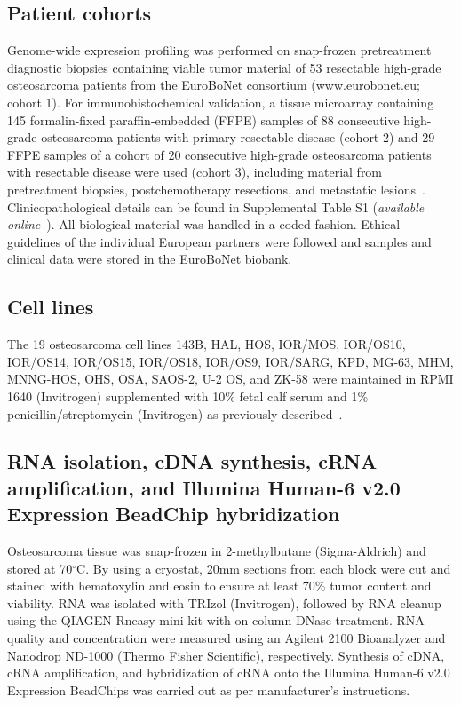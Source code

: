 \subsection{Patient cohorts}
Genome\hyp{}wide expression profiling was performed on
snap\hyp{}frozen pretreatment diagnostic biopsies containing
viable tumor material of 53 resectable high\hyp{}grade osteosarcoma
patients from the EuroBoNet consortium (\url{www.eurobonet.eu}; cohort 1). For immunohistochemical
validation, a tissue microarray containing 145 formalin\hyp{}fixed
paraffin\hyp{}embedded (FFPE) samples of 88 consecutive
high\hyp{}grade osteosarcoma patients with primary resectable
disease (cohort 2) and 29 FFPE samples of a cohort of 20
consecutive high\hyp{}grade osteosarcoma patients with resectable
disease were used (cohort 3), including material from
pretreatment biopsies, postchemotherapy resections, and
metastatic lesions~\cite{mohseny2009osteosarcoma}. Clinicopathological details can be
found in Supplemental Table S1 ({\it available online}~\cite{ch4additional}). All biological material
was handled in a coded fashion. Ethical guidelines of the
individual European partners were followed and samples
and clinical data were stored in the EuroBoNet biobank.

\subsection{Cell lines}
The 19 osteosarcoma cell lines 143B, HAL, HOS,
IOR/MOS, IOR/OS10, IOR/OS14, IOR/OS15, IOR/OS18,
IOR/OS9, IOR/SARG, KPD, MG-63, MHM, MNNG-HOS, OHS, OSA,
SAOS-2, U-2 OS, and ZK-58 were maintained in RPMI
1640 (Invitrogen) supplemented with 10\% fetal calf serum
and 1\% penicillin/streptomycin (Invitrogen) as previously
described~\cite{ottaviano2010molecular}.

\subsection{RNA isolation, cDNA synthesis, cRNA amplification,
and Illumina Human-6 v2.0 Expression BeadChip
hybridization}
Osteosarcoma tissue was snap\hyp{}frozen in 2-methylbutane
(Sigma\hyp{}Aldrich) and stored at 70$^\circ$C. By using a cryostat,
20mm sections from each block were cut and stained with
hematoxylin and eosin to ensure at least 70\% tumor
content and viability. RNA was isolated with TRIzol (Invitrogen),
followed by RNA cleanup using the QIAGEN
Rneasy mini kit with on\hyp{}column DNase treatment. RNA
quality and concentration were measured using an Agilent
2100 Bioanalyzer and Nanodrop ND-1000 (Thermo Fisher
Scientific), respectively. Synthesis of cDNA, cRNA amplification,
and hybridization of cRNA onto the Illumina
Human-6 v2.0 Expression BeadChips was carried out as
per manufacturer's instructions.

